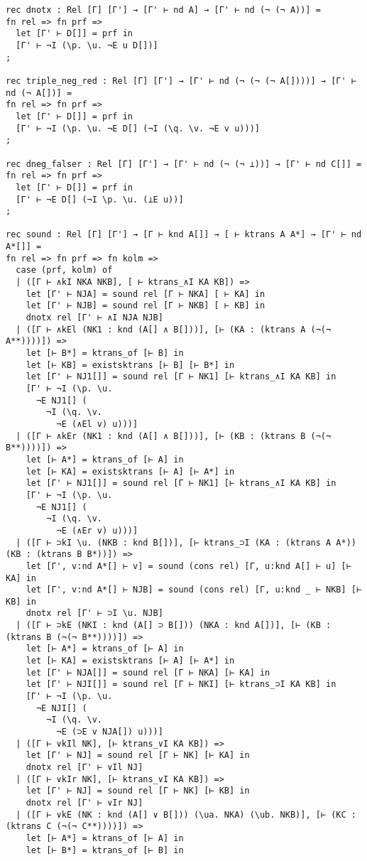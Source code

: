 \documentclass{article}
\begin{document}
\begin{lstlisting}
rec dnotx : Rel [Γ] [Γ'] → [Γ' ⊢ nd A] → [Γ' ⊢ nd (¬ (¬ A))] =
fn rel => fn prf =>
  let [Γ' ⊢ D[]] = prf in
  [Γ' ⊢ ¬I (\p. \u. ¬E u D[])]
;

rec triple_neg_red : Rel [Γ] [Γ'] → [Γ' ⊢ nd (¬ (¬ (¬ A[])))] → [Γ' ⊢ nd (¬ A[])] =
fn rel => fn prf =>
  let [Γ' ⊢ D[]] = prf in
  [Γ' ⊢ ¬I (\p. \u. ¬E D[] (¬I (\q. \v. ¬E v u)))]
;

rec dneg_falser : Rel [Γ] [Γ'] → [Γ' ⊢ nd (¬ (¬ ⊥))] → [Γ' ⊢ nd C[]] =
fn rel => fn prf =>
  let [Γ' ⊢ D[]] = prf in
  [Γ' ⊢ ¬E D[] (¬I \p. \u. (⊥E u))]
;

rec sound : Rel [Γ] [Γ'] → [Γ ⊢ knd A[]] → [ ⊢ ktrans A A*] → [Γ' ⊢ nd A*[]] =
fn rel => fn prf => fn kolm =>
  case (prf, kolm) of
  | ([Γ ⊢ ∧kI NKA NKB], [ ⊢ ktrans_∧I KA KB]) =>
    let [Γ' ⊢ NJA] = sound rel [Γ ⊢ NKA] [ ⊢ KA] in
    let [Γ' ⊢ NJB] = sound rel [Γ ⊢ NKB] [ ⊢ KB] in
    dnotx rel [Γ' ⊢ ∧I NJA NJB]
  | ([Γ ⊢ ∧kEl (NK1 : knd (A[] ∧ B[]))], [⊢ (KA : (ktrans A (¬(¬ A**))))]) =>
    let [⊢ B*] = ktrans_of [⊢ B] in
    let [⊢ KB] = existsktrans [⊢ B] [⊢ B*] in
    let [Γ' ⊢ NJ1[]] = sound rel [Γ ⊢ NK1] [⊢ ktrans_∧I KA KB] in
    [Γ' ⊢ ¬I (\p. \u.
      ¬E NJ1[] (
        ¬I (\q. \v.
          ¬E (∧El v) u)))]
  | ([Γ ⊢ ∧kEr (NK1 : knd (A[] ∧ B[]))], [⊢ (KB : (ktrans B (¬(¬ B**))))]) =>
    let [⊢ A*] = ktrans_of [⊢ A] in
    let [⊢ KA] = existsktrans [⊢ A] [⊢ A*] in
    let [Γ' ⊢ NJ1[]] = sound rel [Γ ⊢ NK1] [⊢ ktrans_∧I KA KB] in
    [Γ' ⊢ ¬I (\p. \u.
      ¬E NJ1[] (
        ¬I (\q. \v.
          ¬E (∧Er v) u)))]
  | ([Γ ⊢ ⊃kI \u. (NKB : knd B[])], [⊢ ktrans_⊃I (KA : (ktrans A A*)) (KB : (ktrans B B*))]) =>
    let [Γ', v:nd A*[] ⊢ v] = sound (cons rel) [Γ, u:knd A[] ⊢ u] [⊢ KA] in
    let [Γ', v:nd A*[] ⊢ NJB] = sound (cons rel) [Γ, u:knd _ ⊢ NKB] [⊢ KB] in
    dnotx rel [Γ' ⊢ ⊃I \u. NJB]
  | ([Γ ⊢ ⊃kE (NKI : knd (A[] ⊃ B[])) (NKA : knd A[])], [⊢ (KB : (ktrans B (¬(¬ B**))))]) =>
    let [⊢ A*] = ktrans_of [⊢ A] in
    let [⊢ KA] = existsktrans [⊢ A] [⊢ A*] in
    let [Γ' ⊢ NJA[]] = sound rel [Γ ⊢ NKA] [⊢ KA] in
    let [Γ' ⊢ NJI[]] = sound rel [Γ ⊢ NKI] [⊢ ktrans_⊃I KA KB] in
    [Γ' ⊢ ¬I (\p. \u.
      ¬E NJI[] (
        ¬I (\q. \v. 
          ¬E (⊃E v NJA[]) u)))]
  | ([Γ ⊢ ∨kIl NK], [⊢ ktrans_∨I KA KB]) =>
    let [Γ' ⊢ NJ] = sound rel [Γ ⊢ NK] [⊢ KA] in
    dnotx rel [Γ' ⊢ ∨Il NJ]
  | ([Γ ⊢ ∨kIr NK], [⊢ ktrans_∨I KA KB]) =>
    let [Γ' ⊢ NJ] = sound rel [Γ ⊢ NK] [⊢ KB] in
    dnotx rel [Γ' ⊢ ∨Ir NJ]
  | ([Γ ⊢ ∨kE (NK : knd (A[] ∨ B[])) (\ua. NKA) (\ub. NKB)], [⊢ (KC : (ktrans C (¬(¬ C**))))]) =>
    let [⊢ A*] = ktrans_of [⊢ A] in
    let [⊢ B*] = ktrans_of [⊢ B] in

\end{lstlisting}
\end{document}
